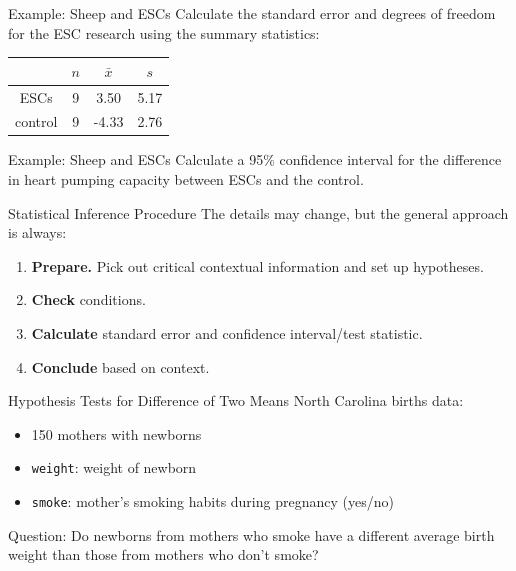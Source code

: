 \begin{frame}{Example: Sheep and ESCs}
    Calculate the standard error and degrees of freedom for the ESC research using the summary statistics: 
    \begin{table}[]
        \centering
        \begin{tabular}{cccc}
            \hline
                    & $n$ & $\bar{x}$ & $s$ \\
            \hline
            ESCs    & 9 & 3.50 & 5.17 \\
            control & 9 & -4.33 & 2.76 \\
            \hline
        \end{tabular}
    \end{table}
\end{frame}

\begin{frame}{Example: Sheep and ESCs}
    Calculate a 95\% confidence interval for the difference in heart pumping capacity between ESCs and the control.
\end{frame}

\begin{frame}{Statistical Inference Procedure}
    The details may change, but the general approach is always:
    \begin{enumerate}
        \item \textbf{Prepare.} Pick out critical contextual information and set up hypotheses.
        \item \textbf{Check} conditions.
        \item \textbf{Calculate} standard error and confidence interval/test statistic.
        \item \textbf{Conclude} based on context.
    \end{enumerate}
\end{frame}

\begin{frame}{Hypothesis Tests for Difference of Two Means}
    North Carolina births data:
    \begin{itemize}
        \item 150 mothers with newborns
        \item \texttt{weight}: weight of newborn
        \item \texttt{smoke}: mother's smoking habits during pregnancy (yes/no)
    \end{itemize}
    
    \vspace{12pt}Question: Do newborns from mothers who smoke have a different average birth weight than those from mothers who don't smoke?
\end{frame}

